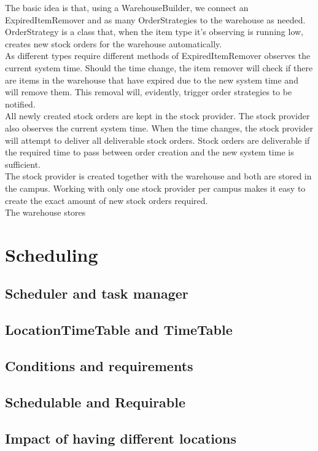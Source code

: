 \documentclass[12pt]{article}
\begin{document}
The basic idea is that, using a WarehouseBuilder, we connect an ExpiredItemRemover and as many OrderStrategies to the warehouse as needed.\\ OrderStrategy is a class that, when the item type it's observing is running low, creates new stock orders for the warehouse automatically.\\
As different types require different methods of 
ExpiredItemRemover observes the current system time. Should the time change, the item remover will check if there are items in the warehouse that have expired due to the new system time and will remove them. This removal will, evidently, trigger order strategies to be notified.\\
All newly created stock orders are kept in the stock provider. The stock provider also observes the current system time. When the time changes, the stock provider will attempt to deliver all deliverable stock orders. Stock orders are deliverable if the required time to pass between order creation and the new system time is sufficient.\\
The stock provider is created together with the warehouse and both are stored in the campus. Working with only one stock provider per campus makes it easy to create the exact amount of new stock orders required.\\
The warehouse stores 

\section{Scheduling}
\subsection{Scheduler and task manager}
\subsection{LocationTimeTable and TimeTable}
\subsection{Conditions and requirements}
\subsection{Schedulable and Requirable}
\subsection{Impact of having different locations}
\end{document}
